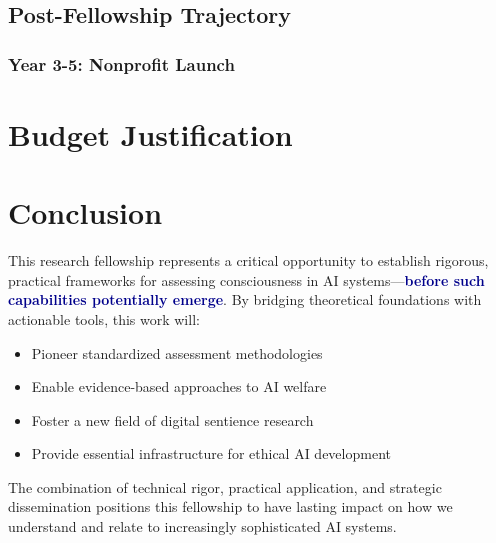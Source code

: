 \documentclass[11pt,a4paper]{article}
\newcommand{\impact}[1]{\textbf{\textcolor{darkblue}{#1}}}
\begin{document}
\subsection{Post-Fellowship Trajectory}

\subsubsection{Year 3-5: Nonprofit Launch}

\section{Budget Justification}
\label{sec:budget}

\section{Conclusion}
\label{sec:conclusion}

This research fellowship represents a critical opportunity to establish rigorous, practical frameworks for assessing consciousness in AI systems—\impact{before such capabilities potentially emerge}. By bridging theoretical foundations with actionable tools, this work will:

\begin{itemize}
    \item Pioneer standardized assessment methodologies
    \item Enable evidence-based approaches to AI welfare
    \item Foster a new field of digital sentience research
    \item Provide essential infrastructure for ethical AI development
\end{itemize}

The combination of technical rigor, practical application, and strategic dissemination positions this fellowship to have lasting impact on how we understand and relate to increasingly sophisticated AI systems.



\end{document}
